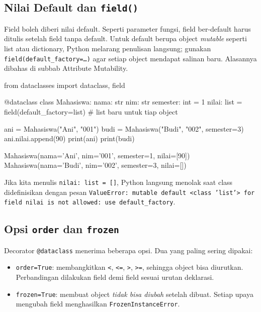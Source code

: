 \subsection{Nilai Default dan \texttt{field()}}

Field boleh diberi nilai default. Seperti parameter fungsi, field ber-default harus ditulis setelah field tanpa default. Untuk default berupa object \emph{mutable} seperti list atau dictionary, Python melarang penulisan langsung; gunakan \texttt{field(default\_factory=\ldots)} agar setiap object mendapat salinan baru. Alasannya dibahas di subbab Attribute Mutability.

\begin{kode}
from dataclasses import dataclass, field

@dataclass
class Mahasiswa:
    nama: str
    nim: str
    semester: int = 1
    nilai: list = field(default_factory=list)   # list baru untuk tiap object

ani = Mahasiswa("Ani", "001")
budi = Mahasiswa("Budi", "002", semester=3)
ani.nilai.append(90)
print(ani)
print(budi)
\end{kode}

\begin{keluaran}
Mahasiswa(nama='Ani', nim='001', semester=1, nilai=[90])
Mahasiswa(nama='Budi', nim='002', semester=3, nilai=[])
\end{keluaran}

Jika kita menulis \texttt{nilai: list = []}, Python langsung menolak saat class didefinisikan dengan pesan \texttt{ValueError: mutable default <class 'list'> for field nilai is not allowed: use default\_factory}.

\subsection{Opsi \texttt{order} dan \texttt{frozen}}

Decorator \texttt{@dataclass} menerima beberapa opsi. Dua yang paling sering dipakai:

\begin{itemize}
  \item \texttt{order=True}: membangkitkan \texttt{<}, \texttt{<=}, \texttt{>}, \texttt{>=}, sehingga object bisa diurutkan. Perbandingan dilakukan field demi field sesuai urutan deklarasi.
  \item \texttt{frozen=True}: membuat object \emph{tidak bisa diubah} setelah dibuat. Setiap upaya mengubah field menghasilkan \texttt{FrozenInstanceError}.
\end{itemize}

